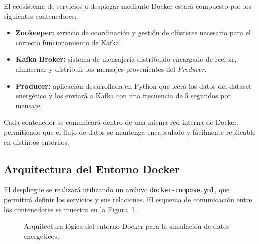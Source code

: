 \documentclass[12pt,a4paper]{article}
\begin{document}
El ecosistema de servicios a desplegar mediante Docker estará compuesto por los siguientes contenedores:

\begin{itemize}
    \item \textbf{Zookeeper:} servicio de coordinación y gestión de clústeres necesario para el correcto funcionamiento de Kafka.
    \item \textbf{Kafka Broker:} sistema de mensajería distribuido encargado de recibir, almacenar y distribuir los mensajes provenientes del \textit{Producer}.
    \item \textbf{Producer:} aplicación desarrollada en Python que leerá los datos del dataset energético y los enviará a Kafka con una frecuencia de 5 segundos por mensaje.
\end{itemize}

Cada contenedor se comunicará dentro de una misma red interna de Docker, permitiendo que el flujo de datos se mantenga encapsulado y fácilmente replicable en distintos entornos.

\subsection{Arquitectura del Entorno Docker}

El despliegue se realizará utilizando un archivo \texttt{docker-compose.yml}, que permitirá definir los servicios y sus relaciones.  
El esquema de comunicación entre los contenedores se muestra en la Figura~\ref{fig:docker-arch}.

\begin{figure}[H]
\centering
{}
\caption{Arquitectura lógica del entorno Docker para la simulación de datos energéticos.}
\label{fig:docker-arch}
\end{figure}
\end{document}
